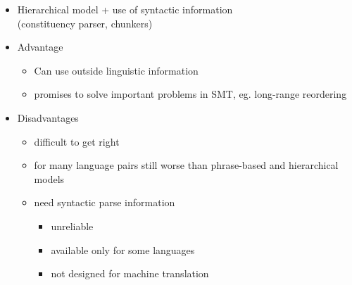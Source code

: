 \documentclass[landscape]{uedslides2C}
\begin{document}
%        
%
%
%
%
%


\begin{itemize} \itemsep -1mm
\item Hierarchical model + use of syntactic information\\
(constituency parser, chunkers)
\item Advantage \vspace{-2mm}
\begin{itemize}
\item Can use outside linguistic information 
\item promises to solve important problems in SMT, eg. long-range reordering
\end{itemize}

\item Disadvantages \vspace{-2mm}
\begin{itemize}
\item difficult to get  right
\item for many language pairs still worse than phrase-based and hierarchical models
\item need syntactic parse information
	\begin{itemize}
	\item unreliable
	\item available only for some languages %
	\item not designed for machine translation
	\end{itemize}
\end{itemize}
\end{itemize}
\end{document}
